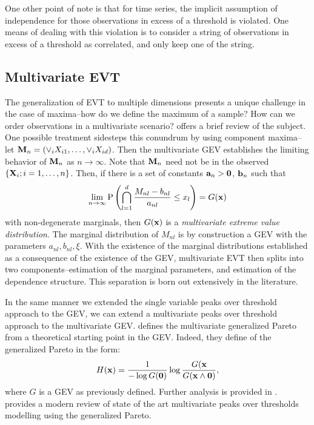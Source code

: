 One other point of note is that for time series, the implicit assumption of independence for those
  observations in excess of a threshold is violated.  One means of dealing with this violation is
  to consider a string of observations in excess of a threshold as correlated, and only keep one
  of the string.

\subsection{Multivariate EVT}
The generalization of EVT to multiple dimensions presents a unique challenge in the case of maxima--how
  do we define the maximum of a sample?  How can we order observations in a multivariate scenario?
  \cite{rootzen2006} offers a brief review of the subject.  One possible treatment sidesteps this
  conundrum by using component maxima--let ${\bf M}_n = \left(\vee_i X_{i1},\ldots,\vee_i X_{id}\right)$.
  Then the multivariate GEV establishes the limiting behavior of ${\bf M}_n$ as $n\to\infty$.  Note
  that ${\bf M}_n$ need not be in the observed $\left\lbrace{\bf X}_i; i = 1,\ldots,n\right\rbrace$.
  Then, if there is a set of constants ${\bf a}_n > {\bf 0}$, ${\bf b}_n$ such that
  \begin{equation*}
    \lim\limits_{n\to\infty}\text{P}\left(\bigcap_{l = 1}^d \frac{M_{nl} - b_{nl}}{a_{nl}} \leq x_l\right) = G({\bf x})
  \end{equation*}
  with non-degenerate marginals, then $G({\bf x})$ is a \emph{multivariate extreme value distribution}.
  The marginal distribution of $M_{nl}$ is by construction a GEV with the parameters $a_{nl}, b_{nl}, \xi$.
  With the existence of the marginal distributions established as a consequence of the existence of the
  GEV, multivariate EVT then splits into two components--estimation of the marginal parameters, and
  estimation of the dependence structure.  This separation is born out extensively in the literature.


In the same manner we extended the single variable peaks over threshold approach to the GEV, we can
  extend a multivariate peaks over threshold approach to the multivariate GEV.  \cite{rootzen2006}
  defines the multivariate generalized Pareto from a theoretical starting point in the GEV.  Indeed,
  they define of the generalized Pareto in the form:
  \begin{equation*}
    H({\bf x}) = \frac{1}{-\log G({\bf 0})}\log\frac{G({\bf x}}{G({\bf x}\wedge {\bf 0})},
  \end{equation*}
  where $G$ is a GEV as previously defined.  Further analysis is provided in \cite{falk2008}.
  \cite{rootzen2018} provides a modern review of state of the art multivariate peaks over thresholds
  modelling using the generalized Pareto.

